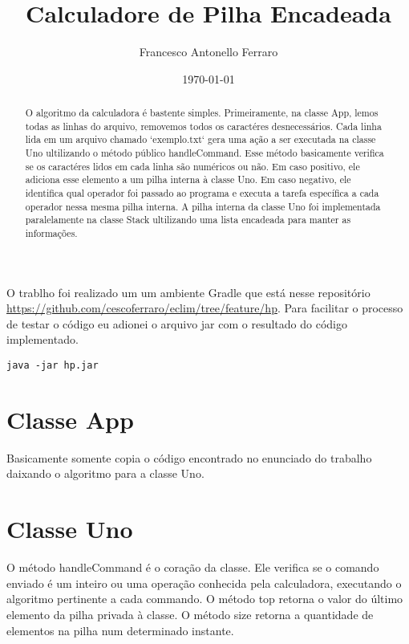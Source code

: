 \documentclass[11pt]{article}
\author{Francesco Antonello Ferraro}
\date{\today}
\title{Calculadore de Pilha Encadeada}
\begin{document}
\maketitle
\begin{abstract}

 O algoritmo da calculadora é bastente simples. Primeiramente, na classe App, lemos todas as linhas do arquivo, removemos todos os caractéres desnecessários. Cada linha lida em um arquivo chamado `exemplo.txt` gera uma ação a ser executada na classe Uno ultilizando o método público handleCommand. 
Esse método basicamente verifica se os caractéres lidos em cada linha são numéricos ou não. Em caso positivo, ele adiciona esse elemento a um pilha interna à classe Uno. Em caso negativo, ele identifica qual operador foi passado ao programa e executa a tarefa específica a cada operador nessa mesma pilha interna. A pilha interna da classe Uno foi implementada paralelamente na classe Stack ultilizando uma lista encadeada para manter as informações.

\end{abstract}




O trablho foi realizado um um ambiente Gradle que está nesse
repositório
\href{https://github.com/cescoferraro/eclim/tree/feature/hp}{https://github.com/cescoferraro/eclim/tree/feature/hp}. Para facilitar
o processo de testar o código eu adionei o arquivo jar com o resultado
do código implementado.

\begin{verbatim}
java -jar hp.jar
\end{verbatim}

\section{Classe App}
\label{sec:org2fd971d}


Basicamente somente copia o código encontrado no enunciado do trabalho
daixando o algoritmo para a classe Uno.

\section{Classe Uno}
\label{sec:org81f1813}

O método handleCommand é o coração da classe. Ele verifica se o
comando enviado é um inteiro ou uma operação conhecida pela
calculadora, executando o algoritmo pertinente a cada commando.
O método top retorna o valor do último elemento da pilha privada à
classe.  O método size retorna a quantidade de elementos na pilha
num determinado instante.
\end{document}
